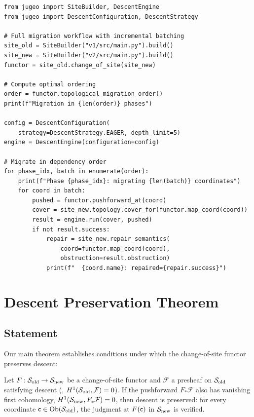 \documentclass[11pt]{article}
\newcommand{\SiteOld}{\Site_{\mathrm{old}}}
\newcommand{\SiteNew}{\Site_{\mathrm{new}}}
\newcommand{\FunctorF}{F}
\newcommand{\Pushforward}{F_*}
\begin{document}
\begin{lstlisting}[style=jugeo-python]
from jugeo import SiteBuilder, DescentEngine
from jugeo import DescentConfiguration, DescentStrategy

# Full migration workflow with incremental batching
site_old = SiteBuilder("v1/src/main.py").build()
site_new = SiteBuilder("v2/src/main.py").build()
functor = site_old.change_of_site(site_new)

# Compute optimal ordering
order = functor.topological_migration_order()
print(f"Migration in {len(order)} phases")

config = DescentConfiguration(
    strategy=DescentStrategy.EAGER, depth_limit=5)
engine = DescentEngine(configuration=config)

# Migrate in dependency order
for phase_idx, batch in enumerate(order):
    print(f"Phase {phase_idx}: migrating {len(batch)} coordinates")
    for coord in batch:
        pushed = functor.pushforward_at(coord)
        cover = site_new.topology.cover_for(functor.map_coord(coord))
        result = engine.run(cover, pushed)
        if not result.success:
            repair = site_new.repair_semantics(
                coord=functor.map_coord(coord),
                obstruction=result.obstruction)
            print(f"  {coord.name}: repaired={repair.success}")
\end{lstlisting}

\section{Descent Preservation Theorem}\label{sec:preservation}

\subsection{Statement}
Our main theorem establishes conditions under which the change-of-site
functor preserves descent:

\begin{theorem}\label{thm:descent-pres}
Let $\FunctorF : \SiteOld \to \SiteNew$ be a change-of-site functor and
$\mathcal{F}$ a presheaf on $\SiteOld$ satisfying descent (\ie,
$\Hcoh{1}(\SiteOld, \mathcal{F}) = 0$).  If the pushforward
$\Pushforward\mathcal{F}$ also has vanishing first cohomology,
$\Hcoh{1}(\SiteNew, \Pushforward\mathcal{F}) = 0$, then descent is
preserved: for every coordinate $\coord \in \Ob(\SiteOld)$, the
judgment at $\FunctorF(\coord)$ in $\SiteNew$ is verified.
\end{theorem}
\end{document}
